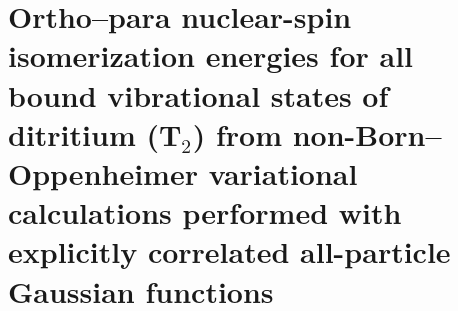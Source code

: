 \chapter{Ortho–para nuclear-spin isomerization energies for all bound vibrational states of ditritium (T$_2$) from non-Born–Oppenheimer variational calculations performed with explicitly correlated all-particle Gaussian functions\label{apndx13}}



